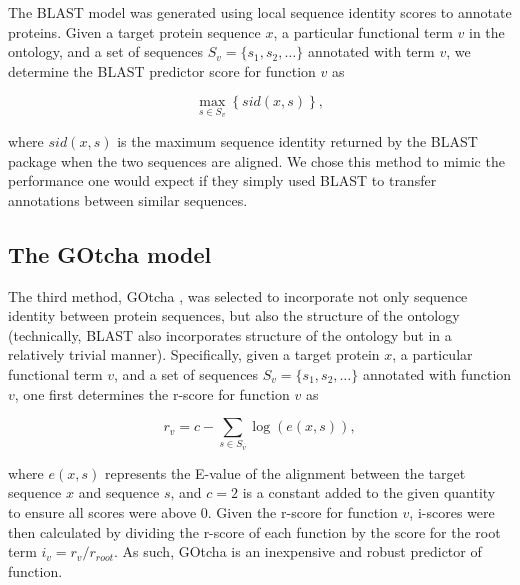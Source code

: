 The BLAST model was generated using local sequence identity scores to annotate proteins. Given a target protein sequence $x$, a particular functional term $v$ in the ontology, and a set of sequences $S_{v}=\{s_{1},s_{2},\ldots\}$ annotated with term $v$, we determine the BLAST predictor score for function $v$ as 


\[
\underset{s\in S_{v}}{\max}\left\{ sid(x,s)\right\}, 
\]

\noindent where $sid(x,s)$ is the maximum sequence identity returned by the BLAST package \citep{Altschul1997} when the two sequences are aligned. We chose this method to mimic the performance one would expect if they simply used BLAST to transfer annotations between similar sequences.

\subsection{The GOtcha model}

The third method, GOtcha \citep{Martin2004}, was selected to incorporate not only sequence identity between protein sequences, but also the structure of the ontology (technically, BLAST also incorporates structure of the ontology but in a relatively trivial manner). %
Specifically, given a target protein $x$, a particular functional term $v$, and a set of sequences $S_{v}=\{s_{1},s_{2},\ldots\}$ annotated with function $v$, one first determines the r-score for function $v$ as 

\[
r_{v}=c - \sum_{s\in S_{v}}\log(e(x,s)), 
\]

\noindent where $e(x,s)$ represents the E-value of the alignment between the target sequence $x$ and sequence $s$, and $c=2$ is a constant added to the given quantity to ensure all scores were above 0. Given the r-score for function $v$, i-scores were then calculated by dividing the r-score of each function by the score for the root term $i_{v}=r_{v}/r_{root}$. As such, GOtcha is an inexpensive and robust predictor of function.


